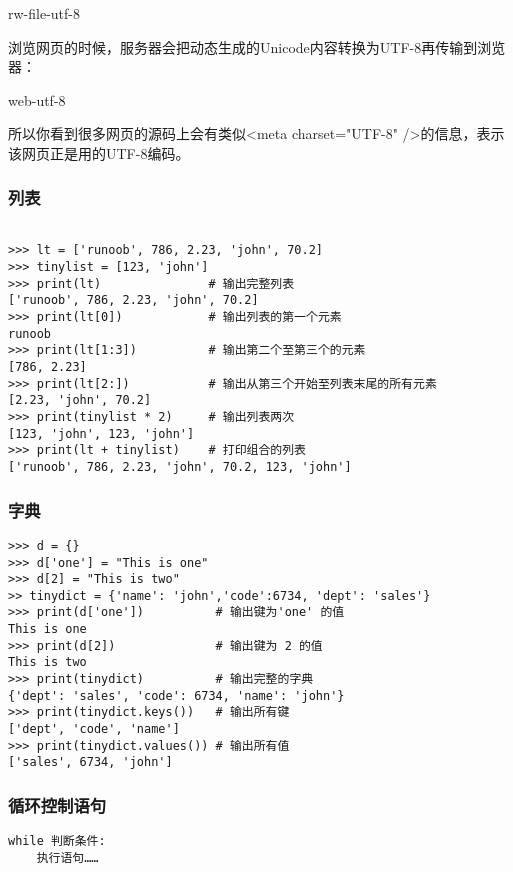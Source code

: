 \documentclass[10pt,a4paper]{ctexbook}
\begin{document}
rw-file-utf-8

浏览网页的时候，服务器会把动态生成的Unicode内容转换为UTF-8再传输到浏览器：

web-utf-8

所以你看到很多网页的源码上会有类似<meta charset="UTF-8" />的信息，表示该网页正是用的UTF-8编码。








\subsubsection{列表}
\begin{verbatim}

>>> lt = ['runoob', 786, 2.23, 'john', 70.2]
>>> tinylist = [123, 'john']
>>> print(lt)               # 输出完整列表
['runoob', 786, 2.23, 'john', 70.2]
>>> print(lt[0])            # 输出列表的第一个元素
runoob
>>> print(lt[1:3])          # 输出第二个至第三个的元素 
[786, 2.23]
>>> print(lt[2:])           # 输出从第三个开始至列表末尾的所有元素
[2.23, 'john', 70.2]
>>> print(tinylist * 2)     # 输出列表两次
[123, 'john', 123, 'john']
>>> print(lt + tinylist)    # 打印组合的列表
['runoob', 786, 2.23, 'john', 70.2, 123, 'john']
\end{verbatim}

\subsubsection{字典}
\begin{verbatim}
>>> d = {}
>>> d['one'] = "This is one"
>>> d[2] = "This is two"
>> tinydict = {'name': 'john','code':6734, 'dept': 'sales'}
>>> print(d['one'])          # 输出键为'one' 的值
This is one
>>> print(d[2])              # 输出键为 2 的值
This is two
>>> print(tinydict)          # 输出完整的字典
{'dept': 'sales', 'code': 6734, 'name': 'john'}
>>> print(tinydict.keys())   # 输出所有键
['dept', 'code', 'name']
>>> print(tinydict.values()) # 输出所有值
['sales', 6734, 'john']
\end{verbatim}

\subsubsection{循环控制语句}
\begin{verbatim}
while 判断条件:
    执行语句……
\end{verbatim}
\end{document}
